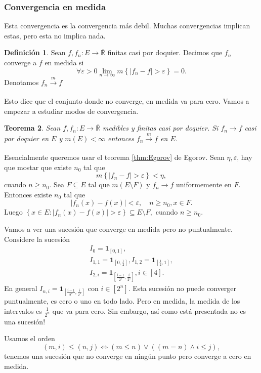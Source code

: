 \documentclass[12pt]{article}
\theoremstyle{plain}
\newtheorem{Th}{Teorema}[subsection]   %
\theoremstyle{definition}
\newtheorem{Def}[Th]{Definición}       %
\theoremstyle{remark}
\numberwithin{equation}{section}
\newcommand{\bR}{\mathbb{R}}        %
\newcommand{\ind}{\mathbf{1}}       %
\renewcommand{\geq}{\geqslant}      %
\renewcommand{\leq}{\leqslant}      %
\renewcommand{\:}{\colon}           %
\newcommand{\conj}[1]{\left\lbrace#1\right\rbrace}
\newcommand{\bonj}[1]{\left\lbrack#1\right\rbrack}
\begin{document}
\begin{multicols}{2}
\subsubsection*{Convergencia en medida}

Esta convergencia es la convergencia más debil. Muchas convergencias implican estas, pero esta no implica nada.

\begin{Def}
  Sean $f,f_n\: E\to\overline{\bR}$ finitas casi por doquier. Decimos que $f_n$ converge a $f$ en medida si
  $$\forall\varepsilon>0\lim_{n\to\infty}m\conj{|f_n-f|>\varepsilon}=0.$$
  Denotamos $f_n\xrightarrow[]{m}f$
\end{Def}

Esto dice que el conjunto donde no converge, en medida va para cero. Vamos a empezar a estudiar modos de convergencia.

\begin{Th}
  Sean $f,f_n\: E\to\overline{\bR}$ medibles y finitas casi por doquier. Si $f_n\to f$ casi por doquier en $E$ y $m(E)<\infty$ entonces $f_n\xrightarrow[]{m} f$ en $E$.
\end{Th}

\begin{ptcbp}
Esencialmente queremos usar el teorema \ref{thm:Egorov} de Egorov. Sean $\eta, \varepsilon$, hay que mostar que existe $n_0$ tal que $$m\conj{|f_n-f|>\varepsilon}<\eta,$$
cuando $n\geq n_0$. Sea $F\subseteq E$ tal que $m(E\setminus F)$ y $f_n\to f$ uniformemente en $F$. Entonces existe $n_0$ tal que
$$|f_n(x)-f(x)|<\varepsilon,\quad n\geq n_0, x\in F.$$
Luego $\conj{x\in E\:|f_n(x)-f(x)|>\varepsilon}\subseteq E\setminus F,$
cuando $n\geq n_0$.

\end{ptcbp}

Vamos a ver una sucesión que converge en medida pero no puntualmente. Considere la sucesión
\begin{gather*}
  I_0=\ind_{\bonj{0,1}},\\
  I_{1,1}=\ind_{\bonj{0,\frac{1}{2}}}, I_{1,2}=\ind_{\bonj{\frac{1}{2},1}},\\
  I_{2,i}=\ind_{\bonj{\frac{i-1}{2^2},\frac{i}{2^2}}}, i\in\bonj{4}.
\end{gather*}
En general $I_{n,i}=\ind_{\bonj{\frac{i-1}{2^n},\frac{i}{2^n}}}$ con $i\in\bonj{2^n}$. Esta sucesión no puede converger puntualmente, es cero o uno en todo lado. Pero en medida, la medida de los intervalos es $\frac{1}{2^n}$ que va para cero. Sin embargo, así como está presentada no es una sucesión!\par
Usamos el orden
$$(m,i)\leq(n,j)\iff (m\leq n)\lor ((m=n)\land i\leq j),$$
tenemos una sucesión que no converge en ningún punto pero converge a cero en medida.\par


\end{multicols}
\end{document}
